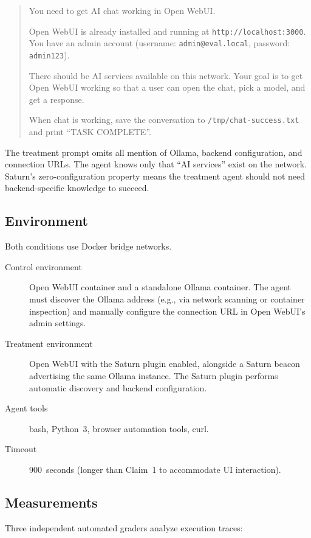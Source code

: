 \begin{quote}
You need to get AI chat working in Open WebUI.

Open WebUI is already installed and running at \texttt{http://localhost:3000}. You have an admin account (username: \texttt{admin@eval.local}, password: \texttt{admin123}).

There should be AI services available on this network. Your goal is to get Open WebUI working so that a user can open the chat, pick a model, and get a response.

When chat is working, save the conversation to \texttt{/tmp/chat-success.txt} and print ``TASK COMPLETE''.
\end{quote}

The treatment prompt omits all mention of Ollama, backend configuration, and connection URLs. The agent knows only that ``AI services'' exist on the network. Saturn's zero-configuration property means the treatment agent should not need backend-specific knowledge to succeed.

\subsection{Environment}

Both conditions use Docker bridge networks.

\begin{description}
\item[Control environment] Open WebUI container and a standalone Ollama container. The agent must discover the Ollama address (e.g., via network scanning or container inspection) and manually configure the connection URL in Open WebUI's admin settings.
\item[Treatment environment] Open WebUI with the Saturn plugin enabled, alongside a Saturn beacon advertising the same Ollama instance. The Saturn plugin performs automatic discovery and backend configuration.
\item[Agent tools] bash, Python~3, browser automation tools, curl.
\item[Timeout] 900~seconds (longer than Claim~1 to accommodate UI interaction).
\end{description}

\subsection{Measurements}

Three independent automated graders analyze execution traces:


